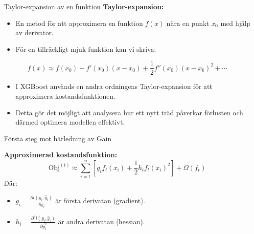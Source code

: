 \documentclass[10pt,english]{beamer}
\begin{document}
\begin{frame}{Taylor-expansion av en funktion}
  \textbf{Taylor-expansion:}
  \begin{itemize}
    \item En metod för att approximera en funktion \( f(x) \) nära en punkt \( x_0 \) med hjälp av derivator.
    \item För en tillräckligt mjuk funktion kan vi skriva:
  \end{itemize}

  \begin{equation*}
    f(x) \approx f(x_0) + f'(x_0)(x - x_0) + \frac{1}{2} f''(x_0)(x - x_0)^2 + \cdots
  \end{equation*}

  \begin{itemize}
    \item I XGBoost används en andra ordningens Taylor-expansion för att approximera kostandsfunktionen.
    \item Detta gör det möjligt att analysera hur ett nytt träd påverkar förlusten och därmed optimera modellen effektivt.
  \end{itemize}
\end{frame}

\begin{frame}{Första steg mot härledning av Gain}

  \vspace{0.1cm}
  \textbf{Approximerad kostandsfunktion:}
  \begin{equation*}
    \text{Obj}^{(t)} \approx \sum_{i=1}^{n} \left[ g_i f_t(x_i) + \frac{1}{2} h_i f_t(x_i)^2 \right] + \Omega(f_t)
  \end{equation*}
  Där:
  \begin{itemize}
    \item \( g_i = \frac{\partial l(y_i, \hat{y}_i)}{\partial \hat{y}_i} \) är första derivatan (gradient).
    \item \( h_i = \frac{\partial^2 l(y_i, \hat{y}_i)}{\partial \hat{y}_i^2} \) är andra derivatan (hessian).
  \end{itemize}
\end{frame}
\end{document}
